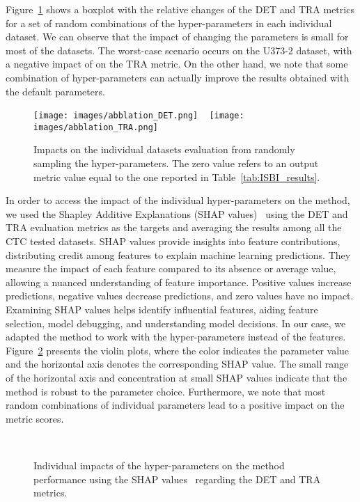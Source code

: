 \documentclass{article}
\begin{document}
Figure~\ref{fig:abblation} shows a boxplot with the relative changes of the DET and TRA metrics for a set of  random combinations of the hyper-parameters in each individual dataset. We can observe that the impact of changing the parameters is small for most of the datasets. The worst-case scenario occurs on the U373-2 dataset, with a negative impact of  on the TRA metric. On the other hand, we note that some combination of hyper-parameters can actually improve the results obtained with the default parameters.

\begin{figure}[]
\centering
\texttt{[image: images/abblation\_DET.png]} ~
\texttt{[image: images/abblation\_TRA.png]}\\
\caption[Impacts on the individual datasets evaluation from randomly sampling the hyper-parameters.]{Impacts on the individual datasets evaluation from randomly sampling the hyper-parameters. The zero value refers to an output metric value equal to the one reported in Table~\ref{tab:ISBI_results}.}
\label{fig:abblation}
\end{figure}

In order to access the impact of the individual hyper-parameters on the method, we used the Shapley Additive Explanations (SHAP values)~\cite{shap,shap_plot} using the DET and TRA evaluation metrics as the targets and averaging the results among all the CTC tested datasets. SHAP values provide insights into feature contributions, distributing credit among features to explain machine learning predictions. They measure the impact of each feature compared to its absence or average value, allowing a nuanced understanding of feature importance. Positive values increase predictions, negative values decrease predictions, and zero values have no impact. Examining SHAP values helps identify influential features, aiding feature selection, model debugging, and understanding model decisions. In our case, we adapted the method to work with the hyper-parameters instead of the features. Figure~\ref{fig:SHAP} presents the violin plots, where the color indicates the parameter value and the horizontal axis denotes the corresponding SHAP value. The small range of the horizontal axis and concentration at small SHAP values indicate that the method is robust to the parameter choice. Furthermore, we note that most random combinations of individual parameters lead to a positive impact on the metric scores. 

\begin{figure}[]
\centering
{} ~
\caption[Individual impacts of the hyper-parameters on the method performance using the SHAP values regarding the DET and TRA metrics.]{Individual impacts of the hyper-parameters on the method performance using the SHAP values~\cite{shap,shap_plot} regarding the DET and TRA metrics.}
\label{fig:SHAP}
\end{figure}
\end{document}
